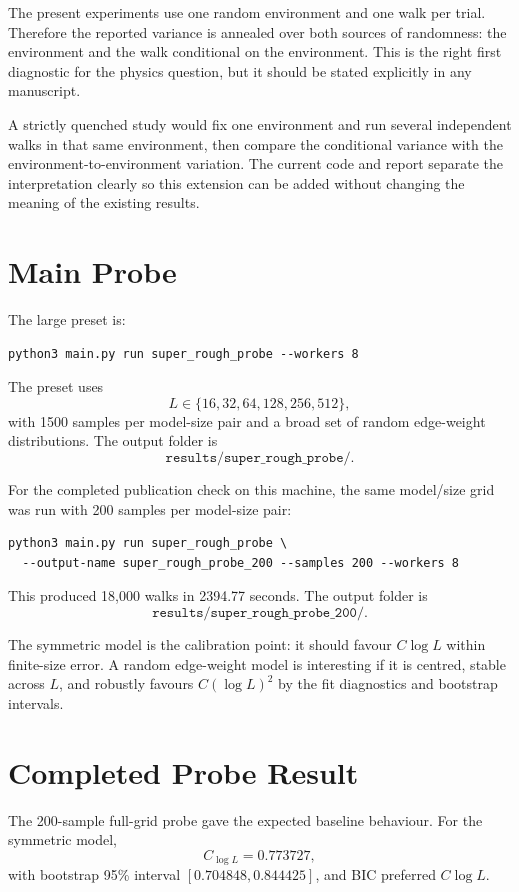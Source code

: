 \documentclass[11pt]{article}
\begin{document}
The present experiments use one random environment and one walk per trial.
Therefore the reported variance is annealed over both sources of randomness:
the environment and the walk conditional on the environment.  This is the right
first diagnostic for the physics question, but it should be stated explicitly
in any manuscript.

A strictly quenched study would fix one environment and run several independent
walks in that same environment, then compare the conditional variance with the
environment-to-environment variation.  The current code and report separate the
interpretation clearly so this extension can be added without changing the
meaning of the existing results.

\section{Main Probe}

The large preset is:
\begin{verbatim}
python3 main.py run super_rough_probe --workers 8
\end{verbatim}
The preset uses
\[
  L\in\{16,32,64,128,256,512\},
\]
with 1500 samples per model-size pair and a broad set of random edge-weight
distributions.  The output folder is
\[
  \texttt{results/super\_rough\_probe/}.
\]

For the completed publication check on this machine, the same model/size grid
was run with 200 samples per model-size pair:
\begin{verbatim}
python3 main.py run super_rough_probe \
  --output-name super_rough_probe_200 --samples 200 --workers 8
\end{verbatim}
This produced 18,000 walks in 2394.77 seconds.  The output folder is
\[
  \texttt{results/super\_rough\_probe\_200/}.
\]

The symmetric model is the calibration point: it should favour \(C\log L\)
within finite-size error.  A random edge-weight model is interesting if it is
centred, stable across \(L\), and robustly favours \(C(\log L)^2\) by the fit
diagnostics and bootstrap intervals.

\section{Completed Probe Result}

The 200-sample full-grid probe gave the expected baseline behaviour.  For the
symmetric model,
\[
  C_{\log L}=0.773727,
\]
with bootstrap 95\% interval \([0.704848,0.844425]\), and BIC preferred
\(C\log L\).
\end{document}
